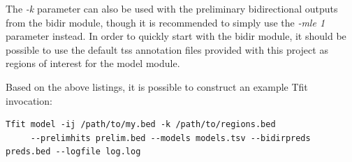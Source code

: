 \documentclass[12pt,letterpaper]{article}
\begin{document}
The \textit{-k} parameter can also be used with the preliminary bidirectional outputs from the bidir module, though it is recommended to simply use the \textit{-mle 1} parameter instead. In order to quickly start with the bidir module, it should be possible to use the default tss annotation files provided with this project as regions of interest for the model module. 

Based on the above listings, it is possible to construct an example Tfit invocation:
\begin{lstlisting}
Tfit model -ij /path/to/my.bed -k /path/to/regions.bed 
     --prelimhits prelim.bed --models models.tsv --bidirpreds preds.bed --logfile log.log
\end{lstlisting}
\end{document}
